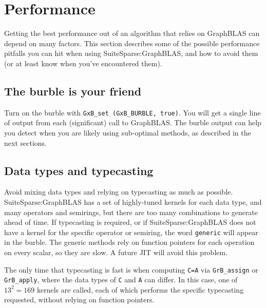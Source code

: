 \documentclass[12pt]{article}
\begin{document}
{\newpage
\section{Performance} %
\label{perf}

Getting the best performance out of an algorithm that relies on GraphBLAS can
depend on many factors.  This section describes some of the possible
performance pitfalls you can hit when using SuiteSparse:GraphBLAS, and how to
avoid them (or at least know when you've encountered them).

\subsection{The burble is your friend}

Turn on the burble with \verb'GxB_set (GxB_BURBLE, true)'.  You will get a
single line of output from each (significant) call to GraphBLAS.
The burble output can help you detect when you are likely using sub-optimal
methods, as described in the next sections.

\subsection{Data types and typecasting}

Avoid mixing data types and relying on typecasting as much as possible.
SuiteSparse:GraphBLAS has a set of highly-tuned kernels for each data type,
and many operators and semirings, but there are too many combinations to
generate ahead of time.  If typecasting is required, or if
SuiteSparse:GraphBLAS does not have a kernel for the specific operator or
semiring, the word \verb'generic' will appear in the burble.  The generic
methods rely on function pointers for each operation on every scalar, so they
are slow.  A future JIT will avoid this problem.

The only time that typecasting is fast is when computing \verb'C=A' via
\verb'GrB_assign' or \verb'GrB_apply', where the data types of \verb'C' and
\verb'A' can differ.  In this case, one of $13^2 = 169$ kernels are called,
each of which performs the specific typecasting requested, without relying on
function pointers.

}
\end{document}
